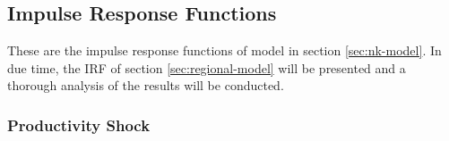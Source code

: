 \documentclass[
thesis.tex
]{subfiles}
\begin{document}
	
	\subsection{Impulse Response Functions}
	
	These are the impulse response functions of model in section \ref{sec:nk-model}. In due time, the IRF of section \ref{sec:regional-model} will be presented and a thorough analysis of the results will be conducted.
	
	\subsubsection{Productivity Shock}
	
\end{document}
